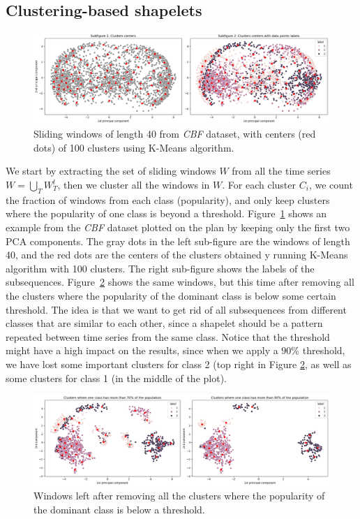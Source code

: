 \documentclass[sigconf, nonacm]{acmart}
\begin{document}
\subsection{Clustering-based shapelets}
\begin{figure}
	\includegraphics[width=\textwidth]{imgs/clustering.png}
	\caption{Sliding windows of length 40 from \emph{CBF} dataset, with centers
		(red dots) of 100 clusters using K-Means algorithm.\label{fig:clustering}}
\end{figure}
We start by extracting the set of sliding windows $W$ from all the time series
$W = \bigcup_T W_T^l$, then we cluster all the windows in $W$.
For each cluster $C_i$, we count the fraction of windows from each class
(popularity), and only keep clusters where the popularity of one class is beyond
a threshold. Figure~\ref{fig:clustering} shows an example from the \emph{CBF}
dataset plotted on the plan by keeping only the first two PCA components. The
gray dots in the left sub-figure are the windows of length 40, and the red dots
are the centers of the clusters obtained y running K-Means algorithm with 100
clusters. The right sub-figure shows the labels of the subsequences.
Figure~\ref{fig:clustering_threshold} shows the same windows, but this time
after removing all the clusters where the popularity of the dominant class is
below some certain threshold.
The idea is that we want to get rid of all subsequences from different classes
that are similar to each other, since a shapelet should be a pattern repeated
between time series from the same class. Notice that the threshold might have a
high impact on the results, since when we apply a $90\%$ threshold, we have lost
some important clusters for class 2 (top right in Figure
\ref{fig:clustering_threshold}, as well as some clusters for class 1 (in the
middle of the plot).
\begin{figure}
	\includegraphics[width=\textwidth]{imgs/clustering_thresholds.png}
	\caption{Windows left after removing all the clusters where the popularity of
		the dominant class is below a threshold\label{fig:clustering_threshold}.}
\end{figure}
\end{document}
